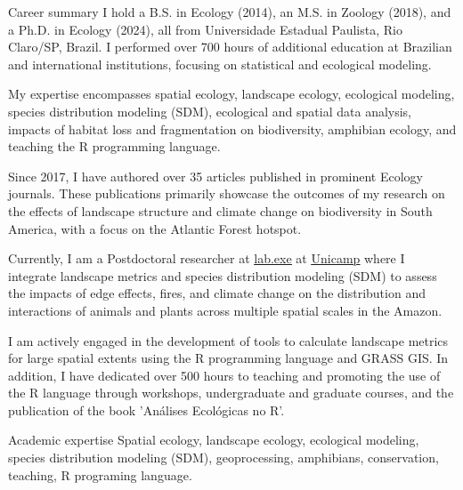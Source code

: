 \documentclass{resume}
\begin{document}

\begin{rSection}{Career summary}
I hold a B.S. in Ecology (2014), an M.S. in Zoology (2018), and a Ph.D. in Ecology (2024), all from Universidade Estadual Paulista, Rio Claro/SP, Brazil. I performed over 700 hours of additional education at Brazilian and international institutions, focusing on statistical and ecological modeling. 

My expertise encompasses spatial ecology, landscape ecology, ecological modeling, species distribution modeling (SDM), ecological and spatial data analysis, impacts of habitat loss and fragmentation on biodiversity, amphibian ecology, and teaching the R programming language. 

Since 2017, I have authored over 35 articles published in prominent Ecology journals. These publications primarily showcase the outcomes of my research on the effects of landscape structure and climate change on biodiversity in South America, with a focus on the Atlantic Forest hotspot.

Currently, I am a Postdoctoral researcher at \href{https://www.mathiasmpires.net.br/index.html}{\underline{lab.exe}} at \href{https://unicamp.br/}{\underline{Unicamp}} where I integrate landscape metrics and species distribution modeling (SDM) to assess the impacts of edge effects, fires, and climate change on the distribution and interactions of animals and plants across multiple spatial scales in the Amazon.

I am actively engaged in the development of tools to calculate landscape metrics for large spatial extents using the R programming language and GRASS GIS. In addition, I have dedicated over 500 hours to teaching and promoting the use of the R language through workshops, undergraduate and graduate courses, and the publication of the book 'Análises Ecológicas no R'.
\end{rSection}


\begin{rSection}{Academic expertise}
Spatial ecology, landscape ecology, ecological modeling, species distribution modeling (SDM), geoprocessing, amphibians, conservation, teaching, R programing language.
\end{rSection}
\end{document}
